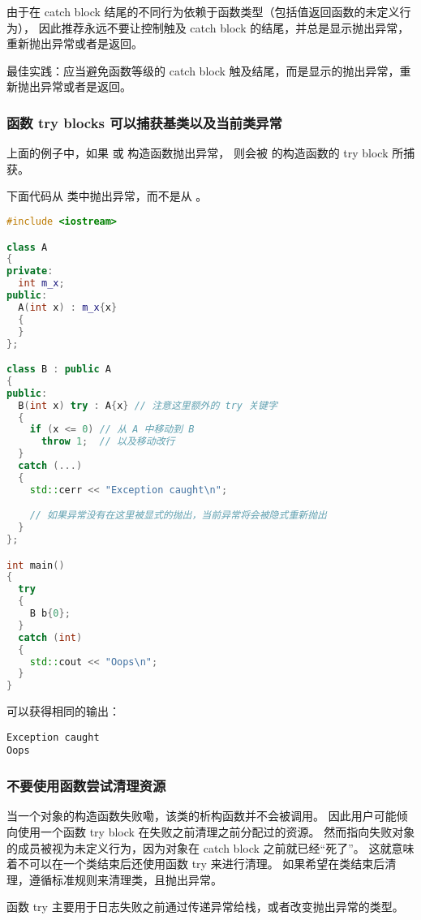 \documentclass[../../LearnCpp.tex]{subfiles}
\begin{document}
由于在 catch block 结尾的不同行为依赖于函数类型（包括值返回函数的未定义行为），
因此推荐永远不要让控制触及 catch block 的结尾，并总是显示抛出异常，重新抛出异常或者是返回。

最佳实践：应当避免函数等级的 catch block 触及结尾，而是显示的抛出异常，重新抛出异常或者是返回。

\subsubsection*{函数 try blocks 可以捕获基类以及当前类异常}

上面的例子中，如果  或  构造函数抛出异常，
则会被  的构造函数的 try block 所捕获。

下面代码从  类中抛出异常，而不是从 。

\begin{lstlisting}[language=C++]
#include <iostream>

class A
{
private:
  int m_x;
public:
  A(int x) : m_x{x}
  {
  }
};

class B : public A
{
public:
  B(int x) try : A{x} // 注意这里额外的 try 关键字
  {
    if (x <= 0) // 从 A 中移动到 B
      throw 1;  // 以及移动改行
  }
  catch (...)
  {
    std::cerr << "Exception caught\n";

    // 如果异常没有在这里被显式的抛出，当前异常将会被隐式重新抛出
  }
};

int main()
{
  try
  {
    B b{0};
  }
  catch (int)
  {
    std::cout << "Oops\n";
  }
}
\end{lstlisting}

可以获得相同的输出：

\begin{lstlisting}
Exception caught
Oops
\end{lstlisting}

\subsubsection*{不要使用函数尝试清理资源}

当一个对象的构造函数失败嘞，该类的析构函数并不会被调用。
因此用户可能倾向使用一个函数 try block 在失败之前清理之前分配过的资源。
然而指向失败对象的成员被视为未定义行为，因为对象在 catch block 之前就已经“死了”。
这就意味着不可以在一个类结束后还使用函数 try 来进行清理。
如果希望在类结束后清理，遵循标准规则来清理类，且抛出异常。

函数 try 主要用于日志失败之前通过传递异常给栈，或者改变抛出异常的类型。
\end{document}
